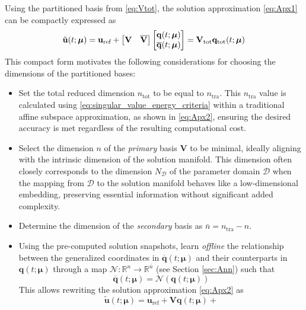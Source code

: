 \documentclass[preprint,10pt]{elsarticle}
\begin{document}
Using the partitioned basis from \eqref{eq:Vtot}, the solution approximation \eqref{eq:Apx1} can be compactly expressed as
\begin{equation} 
	\tilde{\mathbf{u}}(t; \boldsymbol{\mu}) = \mathbf{u}_\text{ref} + \begin{bmatrix} \mathbf{V} & \overline{\mathbf{V}} \end{bmatrix} \begin{bmatrix} \mathbf{q}(t; \boldsymbol{\mu}) \cr \overline{\mathbf{q}}(t; \boldsymbol{\mu}) \end{bmatrix} = \mathbf{V}_\text{tot} \mathbf{q}_\text{tot}(t; \boldsymbol{\mu}) 
	\label{eq:Apx2}
\end{equation}
This compact form motivates the following considerations for choosing the dimensions of the partitioned bases:
\begin{itemize}
	\item Set the total reduced dimension $n_\text{tot}$ to be equal to $n_\text{tra}$. This $n_\text{tra}$ value is calculated 
		using \eqref{eq:singular_value_energy_criteria} within a traditional affine subspace approximation, as shown 
		in \eqref{eq:Apx2}, ensuring the desired accuracy is met regardless of the resulting computational cost.
	\item Select the dimension $n$ of the {\it primary} basis $\mathbf V$ to be minimal, ideally aligning with the intrinsic dimension of the solution manifold. This dimension often 
		closely corresponds to the dimension $N_\mathcal{D}$ of the parameter domain $\mathcal{D}$ when the mapping from $\mathcal{D}$ to the solution manifold behaves like a 
	    low-dimensional embedding, preserving essential information without significant added complexity.
    \item Determine the dimension of the {\it secondary} basis as $\bar{n} = n_\text{tra} - n$.
    \item Using the pre-computed solution snapshots, learn {\it offline} the relationship between the generalized coordinates in $\overline{\mathbf{q}}(t; \boldsymbol{\mu})$ and their
	    counterparts in $\mathbf{q}(t; \boldsymbol{\mu})$ through a map $\mathcal{N}: \mathbb{R}^n \to \mathbb{R}^{\bar{n}}$ (see Section \eqref{sec:Ann}) such that
    \begin{equation} 
	    \overline{\mathbf{q}}(t; \boldsymbol{\mu}) = \mathcal{N}(\mathbf{q}(t; \boldsymbol{\mu}))
	    \label{eq:Map}
    \end{equation} 
	This allows rewriting the solution approximation \eqref{eq:Apx2} as 
		\begin{equation} \tilde{\mathbf{u}}(t; \boldsymbol{\mu}) = \mathbf{u}_\text{ref} + \mathbf{V} \mathbf{q}(t; \boldsymbol{\mu}) + 

\end{equation}
\end{itemize}
\end{document}
